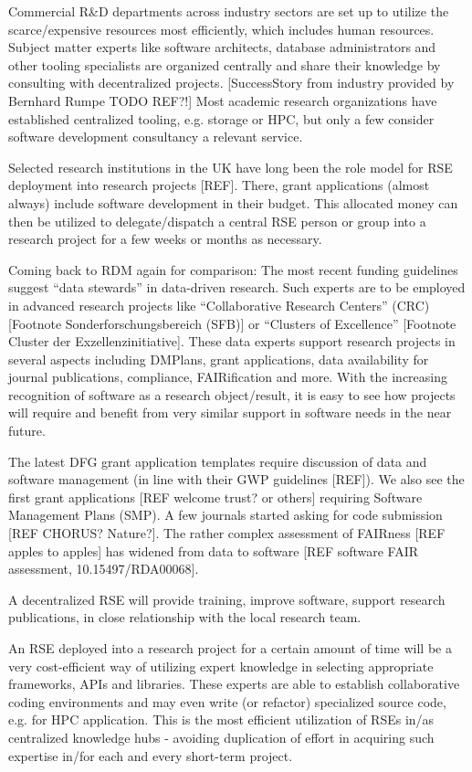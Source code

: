 \documentclass{article}
\begin{document}
Commercial R\&D departments across industry sectors are set up to utilize the scarce/expensive resources most efficiently, which includes human resources.
Subject matter experts like software architects, database administrators and other tooling specialists are organized centrally and share their knowledge by consulting with decentralized projects.
[SuccessStory from industry provided by Bernhard Rumpe TODO REF?!]
Most academic research organizations have established centralized tooling, e.g. storage or HPC, but only a few consider software development consultancy a relevant service. 

Selected research institutions in the UK have long been the role model for RSE deployment into research projects [REF].
There, grant applications (almost always) include software development in their budget.
This allocated money can then be utilized to delegate/dispatch a central RSE person or group into a research project for a few weeks or months as necessary.

Coming back to RDM again for comparison: The most recent funding guidelines suggest  “data stewards” in data-driven research.
Such experts are to be employed in advanced research projects like “Collaborative Research Centers” (CRC)[Footnote Sonderforschungsbereich (SFB)] or “Clusters of Excellence” [Footnote Cluster der Exzellenzinitiative].
These data experts support research projects in several aspects including DMPlans, grant applications, data availability for journal publications, compliance, FAIRification and more.
With the increasing recognition of software as a research object/result, it is easy to see how projects will require and benefit from very similar support in software needs in the near future.

The latest DFG grant application templates require discussion of data and software management (in line with their GWP guidelines [REF]).
We also see the first grant applications [REF welcome trust? or others] requiring Software Management Plans (SMP).
A few journals started asking for code submission [REF CHORUS? Nature?].
The rather complex assessment of FAIRness [REF apples to apples] has widened from data to software [REF software FAIR assessment, 10.15497/RDA00068]. 

A decentralized RSE will provide training, improve software, support research publications, in close relationship with the local research team.

An RSE deployed into a research project for a certain amount of time will be a very cost-efficient way of utilizing expert knowledge in selecting appropriate frameworks, APIs and libraries.
These experts are able to establish collaborative coding environments and may even write (or refactor) specialized source code, e.g. for HPC application.
This is the most efficient utilization of RSEs in/as centralized knowledge hubs - avoiding duplication of effort in acquiring such expertise in/for each and every short-term project.
\end{document}
